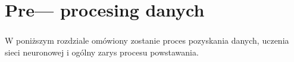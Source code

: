 \chapter{Pre--- procesing danych}
\subsection*{} \noindent W poniższym rozdziale omówiony zostanie proces pozyskania danych, uczenia sieci neuronowej i ogólny zarys procesu powstawania.